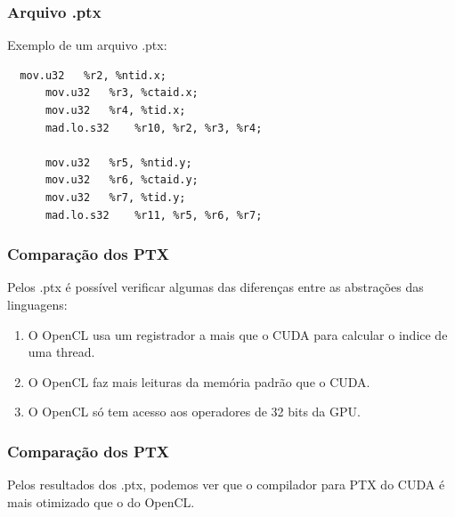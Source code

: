 \documentclass[brazil]{beamer}
\begin{document}

\begin{frame}[fragile]
  \frametitle{Arquivo .ptx}
  Exemplo de um arquivo .ptx:
  \begin{lstlisting}
  mov.u32 	%r2, %ntid.x;
	  mov.u32 	%r3, %ctaid.x;
	  mov.u32 	%r4, %tid.x;
	  mad.lo.s32 	%r10, %r2, %r3, %r4;
	  
	  mov.u32 	%r5, %ntid.y;
	  mov.u32 	%r6, %ctaid.y;
	  mov.u32 	%r7, %tid.y;
	  mad.lo.s32 	%r11, %r5, %r6, %r7;
  \end{lstlisting}
\end{frame}

\begin{frame}[fragile]
  \frametitle{Comparação dos PTX}
  Pelos .ptx é possível verificar algumas das diferenças entre as abstrações das linguagens:
  \begin{enumerate}
    \item O OpenCL usa um registrador a mais que o CUDA para calcular o indice de uma thread.
    \item O OpenCL faz mais leituras da memória padrão que o CUDA. 
    \item O OpenCL só tem acesso aos operadores de 32 bits da GPU.
  \end{enumerate}
\end{frame}

\begin{frame}
  \frametitle{Comparação dos PTX}
  Pelos resultados dos .ptx, podemos ver que o compilador para PTX do CUDA é mais otimizado que o do OpenCL. \\
\end{frame}
\end{document}

